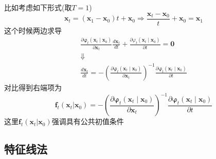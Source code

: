 \documentclass{article}
\newcommand{\nobracket}{}
\newcommand{\tmmathbf}[1]{\ensuremath{\boldsymbol{#1}}}
\begin{document}
\begin{CJK*}{UTF8}{gbsn}
比如考虑如下形式(取$T = 1$)
\[ \tmmathbf{x}_t = (\tmmathbf{x}_1 -\tmmathbf{x}_0) t +\tmmathbf{x}_0
   \Rightarrow \frac{\tmmathbf{x}_t -\tmmathbf{x}_0}{t} +\tmmathbf{x}_0
   =\tmmathbf{x}_1 \]
这个时候两边求导
\[ \begin{array}{c}
     \frac{\partial \tmmathbf{\varphi}_t (\tmmathbf{x}_t \mid
     \tmmathbf{x}_0)}{\partial \tmmathbf{x}_t}  \frac{d\tmmathbf{x}_t}{dt} +
     \frac{\partial \varphi_t (\tmmathbf{x}_t \mid \tmmathbf{x}_0)}{\partial
     t} = \textbf{0}\\
     \Downarrow\\
     \frac{d\tmmathbf{x}_t}{dt} = - \left( \frac{\partial \tmmathbf{\varphi}_t
     (\tmmathbf{x}_t \mid \tmmathbf{x}_0)}{\partial \tmmathbf{x}_t} \right)^{-
     1} \frac{\partial \tmmathbf{\varphi}_t (\tmmathbf{x}_t \mid
     \tmmathbf{x}_0)}{\partial t}
   \end{array} \]
对比得到右端项为
\[ \tmmathbf{f}_t (\tmmathbf{x}_t | \tmmathbf{x}_0 \nobracket) = - \left(
   \frac{\partial \tmmathbf{\varphi}_t (\tmmathbf{x}_t \mid
   \tmmathbf{x}_0)}{\partial \tmmathbf{x}_t} \right)^{- 1} \frac{\partial
   \tmmathbf{\varphi}_t (\tmmathbf{x}_t \mid \tmmathbf{x}_0)}{\partial t} \]
这里$\tmmathbf{f}_t (\tmmathbf{x}_t | \tmmathbf{x}_0
\nobracket)$强调具有公共初值条件

\subsection{特征线法}

\end{CJK*}
\end{document}
